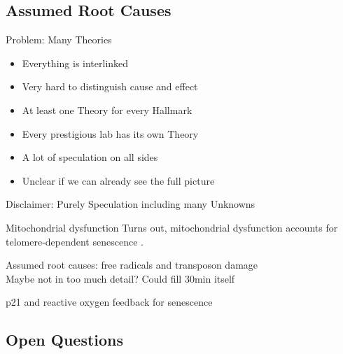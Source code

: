 \subsection{Assumed Root Causes}

\begin{frame}[c]{Problem: Many Theories}
    \large
    \begin{itemize}[<+(1)->]
        \item Everything is interlinked
        \item Very hard to distinguish cause and effect
        \item At least one Theory for every Hallmark
        \item Every prestigious lab has its own Theory
        \item A lot of speculation on all sides
        \item Unclear if we can already see the full picture
    \end{itemize}
\end{frame}


\addtocounter{framenumber}{1}
\begin{frame}[standout]
    Disclaimer: Purely Speculation including many Unknowns
\end{frame}

\begin{frame}[c]{Mitochondrial dysfunction}
    \large
    Turns out, mitochondrial dysfunction accounts for telomere-dependent senescence \cite{passos2007mitochondrial}.
\end{frame}


\begin{frame}[c]
    \large
    Assumed root causes: free radicals and transposon damage \\
    Maybe not in too much detail? Could fill 30min itself \cite{CorePath13:online} \\
    \pause

    p21 and reactive oxygen feedback for senescence \cite{passos2010feedback}
\end{frame}



\subsection{Open Questions}

